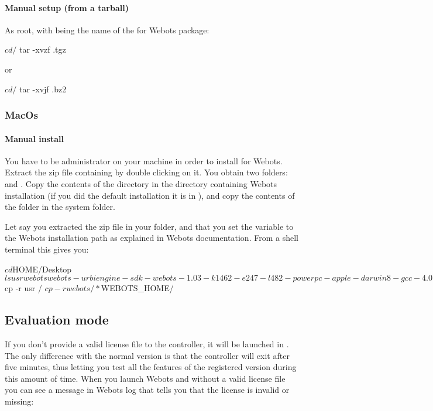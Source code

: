 \paragraph{Manual setup (from a tarball)}
\label{webots.setup.linux.tarball}%
As root, with  being the name of the \urbi for Webots
package:

\begin{shell}
$ cd /
$ tar -xvzf  .tgz
\end{shell}
or

\begin{shell}
$ cd /
$ tar -xvjf  .bz2
\end{shell}

\subsubsection{MacOs}
\label{webots.setup.macos}%

\paragraph{Manual install}
\label{webots.setup.macos.manual}%

You have to be administrator on your machine in order to install \urbi
for Webots.  Extract the zip file containing \urbi by double clicking
on it.  You obtain two folders:  and .  Copy
the contents of the  directory in the directory
containing Webots installation (if you did the default installation it
is in ), and copy the contents of the
 folder in the  system folder.

Let say you extracted the zip file in your  folder, and
that you set the variable  to the Webots
installation path as explained in Webots documentation.  From a shell
terminal this gives you:

\begin{shell}
$ cd $HOME/Desktop
$ ls
usr webots
webots-urbiengine-sdk-webots-1.03-k1462-e247-l482-powerpc-apple-darwin8-gcc-4.0.1.zip
$ cp -r usr /
$ cp -r webots/* $WEBOTS_HOME/
\end{shell}

\subsection{Evaluation mode}
\label{webots.evaluation}%

If you don't provide a valid license file to the \urbi controller, it
will be launched in . The only difference with
the normal version is that the controller will exit after five
minutes, thus letting you test all the features of the registered
version during this amount of time. When you launch Webots and \urbi
without a valid license file you can see a message in Webots log that
tells you that the license is invalid or missing:


